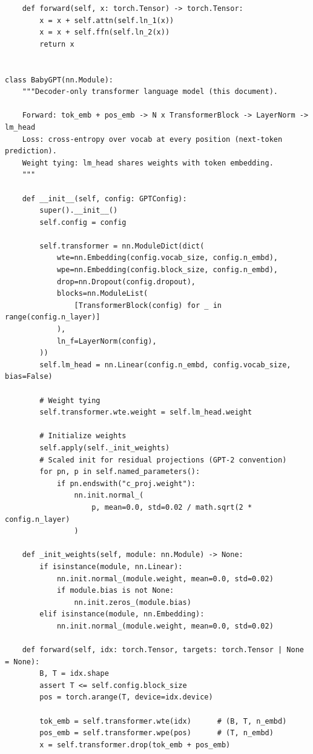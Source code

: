 \begin{lstlisting}
    def forward(self, x: torch.Tensor) -> torch.Tensor:
        x = x + self.attn(self.ln_1(x))
        x = x + self.ffn(self.ln_2(x))
        return x


class BabyGPT(nn.Module):
    """Decoder-only transformer language model (this document).

    Forward: tok_emb + pos_emb -> N x TransformerBlock -> LayerNorm -> lm_head
    Loss: cross-entropy over vocab at every position (next-token prediction).
    Weight tying: lm_head shares weights with token embedding.
    """

    def __init__(self, config: GPTConfig):
        super().__init__()
        self.config = config

        self.transformer = nn.ModuleDict(dict(
            wte=nn.Embedding(config.vocab_size, config.n_embd),
            wpe=nn.Embedding(config.block_size, config.n_embd),
            drop=nn.Dropout(config.dropout),
            blocks=nn.ModuleList(
                [TransformerBlock(config) for _ in range(config.n_layer)]
            ),
            ln_f=LayerNorm(config),
        ))
        self.lm_head = nn.Linear(config.n_embd, config.vocab_size, bias=False)

        # Weight tying
        self.transformer.wte.weight = self.lm_head.weight

        # Initialize weights
        self.apply(self._init_weights)
        # Scaled init for residual projections (GPT-2 convention)
        for pn, p in self.named_parameters():
            if pn.endswith("c_proj.weight"):
                nn.init.normal_(
                    p, mean=0.0, std=0.02 / math.sqrt(2 * config.n_layer)
                )

    def _init_weights(self, module: nn.Module) -> None:
        if isinstance(module, nn.Linear):
            nn.init.normal_(module.weight, mean=0.0, std=0.02)
            if module.bias is not None:
                nn.init.zeros_(module.bias)
        elif isinstance(module, nn.Embedding):
            nn.init.normal_(module.weight, mean=0.0, std=0.02)

    def forward(self, idx: torch.Tensor, targets: torch.Tensor | None = None):
        B, T = idx.shape
        assert T <= self.config.block_size
        pos = torch.arange(T, device=idx.device)

        tok_emb = self.transformer.wte(idx)      # (B, T, n_embd)
        pos_emb = self.transformer.wpe(pos)      # (T, n_embd)
        x = self.transformer.drop(tok_emb + pos_emb)


\end{lstlisting}
